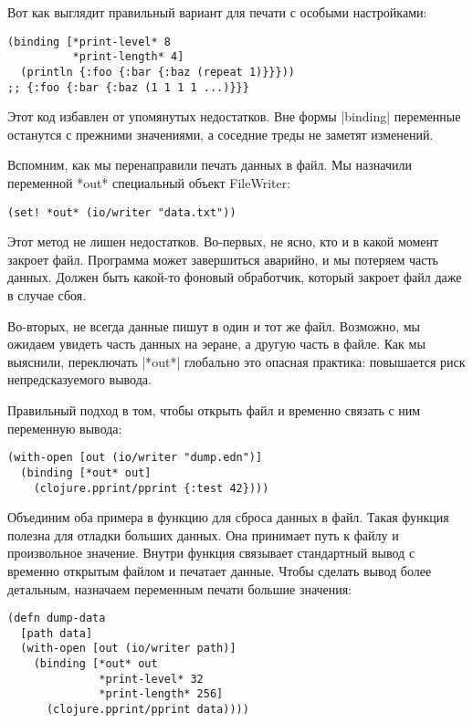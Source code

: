 Вот как выглядит правильный вариант для печати с особыми настройками:

\begin{verbatim}
(binding [*print-level* 8
          *print-length* 4]
  (println {:foo {:bar {:baz (repeat 1)}}}))
;; {:foo {:bar {:baz (1 1 1 1 ...)}}}
\end{verbatim}

Этот код избавлен от упомянутых недостатков. Вне формы \spverb|binding| переменные
останутся с прежними значениями, а соседние треды не заметят изменений.

Вспомним, как мы перенаправили печать данных в файл. Мы назначили переменной
*out* специальный объект FileWriter:

\begin{verbatim}
(set! *out* (io/writer "data.txt"))
\end{verbatim}

Этот метод не лишен недостатков. Во-первых, не ясно, кто и в какой момент
закроет файл. Программа может завершиться аварийно, и мы потеряем часть
данных. Должен быть какой-то фоновый обработчик, который закроет файл даже в
случае сбоя.

Во-вторых, не всегда данные пишут в один и тот же файл. Возможно, мы ожидаем
увидеть часть данных на эеране, а другую часть в файле. Как мы выяснили,
переключать \spverb|*out*| глобально это опасная практика: повышается риск
непредсказуемого вывода.

Правильный подход в том, чтобы открыть файл и временно связать с ним переменную
вывода:

\begin{verbatim}
(with-open [out (io/writer "dump.edn")]
  (binding [*out* out]
    (clojure.pprint/pprint {:test 42})))
\end{verbatim}

Объединим оба примера в функцию для сброса данных в файл. Такая функция полезна
для отладки больших данных. Она принимает путь к файлу и произвольное
значение. Внутри функция связывает стандартный вывод с временно открытым файлом
и печатает данные. Чтобы сделать вывод более детальным, назначаем переменным
печати большие значения:

\begin{verbatim}
(defn dump-data
  [path data]
  (with-open [out (io/writer path)]
    (binding [*out* out
              *print-level* 32
              *print-length* 256]
      (clojure.pprint/pprint data))))
\end{verbatim}

